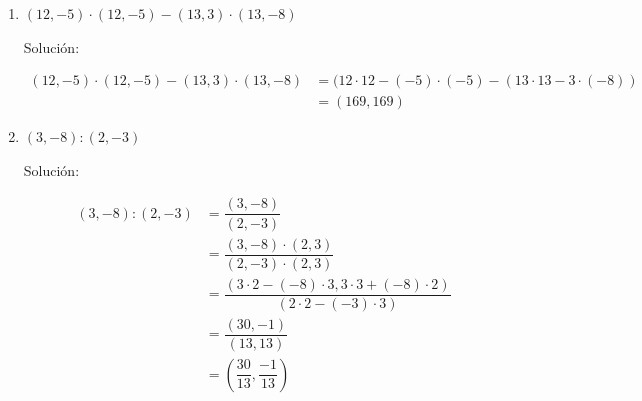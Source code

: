 \documentclass{article}
\theoremstyle{definition}
\begin{document}
\begin{enumerate}
\begin{enumerate}
            \item $(12, -5) \cdotp (12, -5) - (13, 3) \cdotp (13, -8)$
            \begin{center}
                Solución:
            \end{center}
            \begin{align*}
                (12, -5) \cdotp (12, -5) - (13, 3) \cdotp (13, -8) &= (12 \cdotp 12 - (-5) \cdotp (-5) - (13 \cdotp 13 - 3 \cdotp (-8)) \\
                &= \boxed{(169, 169)}
            \end{align*}
            \item $(3, -8) : (2, -3)$
            \begin{center}
                Solución:
            \end{center}
            \begin{align*}
                (3, -8) : (2, -3) &= \dfrac{(3, -8)}{(2, -3)} \\
                &= \dfrac{(3, -8) \cdotp (2, 3)}{(2, -3) \cdotp (2, 3)} \\
                &= \dfrac{(3 \cdotp 2 - (-8) \cdotp 3, 3 \cdotp 3 + (-8) \cdotp 2)}{(2 \cdotp 2 - (-3) \cdotp 3)} \\
                &= \dfrac{(30, -1)}{(13, 13)} \\
                &= \boxed{\left(\dfrac{30}{13}, \dfrac{-1}{13}\right)}
            \end{align*}
        \end{enumerate}
    \end{enumerate}
\end{document}
